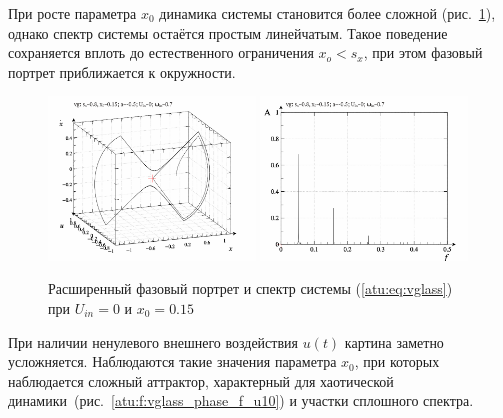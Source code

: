 При росте параметра $x_0$ динамика системы становится более сложной
(рис.~\ref{atu:f:vglass_phase_f_u01}),
однако спектр системы остаётся простым линейчатым.
Такое поведение сохраняется вплоть до естественного ограничения $x_o < s_x$,
при этом фазовый портрет приближается к окружности.

\begin{figure}[ht!]
\begin{center}
  \includegraphics[width=0.49\textwidth]{p/cha/vg/vg_0-p_phe_0x00_0x70_0x15.png}
  \hfill
  \includegraphics[width=0.49\textwidth]{p/cha/vg/vg_fft-p_f_0x00_0x70_0x15.png}
\end{center}
  \caption{Расширенный фазовый портрет и спектр системы (\ref{atu:eq:vglass}) при $U_{in}=0$ и $x_0=0.15$}
\label{atu:f:vglass_phase_f_u01}
\end{figure}

При наличии ненулевого внешнего воздействия $u(t)$
картина заметно усложняется.
Наблюдаются такие значения параметра $x_0$,
при которых наблюдается сложный аттрактор, характерный для
хаотической динамики~(рис.~\ref{atu:f:vglass_phase_f_u10})
и участки сплошного спектра.

